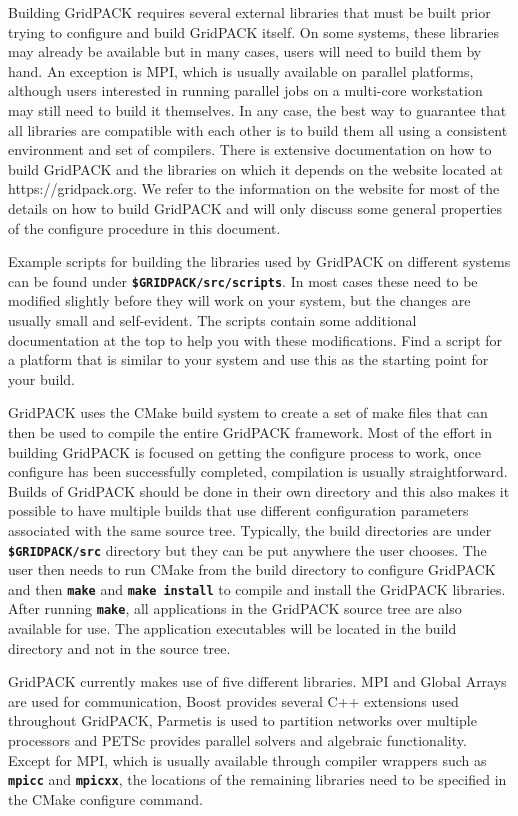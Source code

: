 \documentclass[12pt]{report} %
\begin{document}
Building GridPACK requires several external libraries that must be built prior trying to configure and build GridPACK itself. On some systems, these libraries may already be available but in many cases, users will need to build them by hand. An exception is MPI, which is usually available on parallel platforms, although users interested in running parallel jobs on a multi-core workstation may still need to build it themselves. In any case, the best way to guarantee that all libraries are compatible with each other is to build them all using a consistent environment and set of compilers. There is extensive documentation on how to build GridPACK and the libraries on which it depends on the website located at https://gridpack.org. We refer to the information on the website for most of the details on how to build GridPACK and will only discuss some general properties of the configure procedure in this document.

Example scripts for building the libraries used by GridPACK on different systems can be found under \texttt{\textbf{\$GRIDPACK/src/scripts}}. In most cases these need to be modified slightly before they will work on your system, but the changes are usually small and self-evident. The scripts contain some additional documentation at the top to help you with these modifications. Find a script for a platform that is similar to your system and use this as the starting point for your build.

GridPACK uses the CMake build system to create a set of make files that can then be used to compile the entire GridPACK framework. Most of the effort in building GridPACK is focused on getting the configure process to work, once configure has been successfully completed, compilation is usually straightforward. Builds of GridPACK should be done in their own directory and this also makes it possible to have multiple builds that use different configuration parameters associated with the same source tree. Typically, the build directories are under \texttt{\textbf{\$GRIDPACK/src}} directory but they can be put anywhere the user chooses. The user then needs to run CMake from the build directory to configure GridPACK and then \texttt{\textbf{make}} and \texttt{\textbf{make install}} to compile and install the GridPACK libraries. After running \texttt{\textbf{make}}, all applications in the GridPACK source tree are also available for use. The application executables will be located in the build directory and not in the source tree. 

GridPACK currently makes use of five different libraries. MPI and Global Arrays are used for communication, Boost provides several C++ extensions used throughout GridPACK, Parmetis is used to partition networks over multiple processors and PETSc provides parallel solvers and algebraic functionality. Except for MPI, which is usually available through compiler wrappers such as \texttt{\textbf{mpicc}} and \texttt{\textbf{mpicxx}}, the locations of the remaining libraries need to be specified in the CMake configure command.
\end{document}

